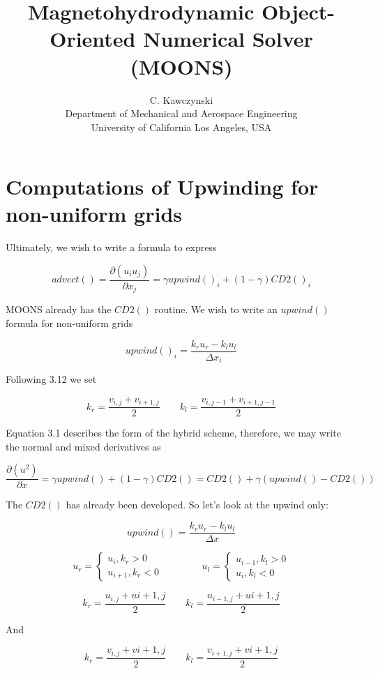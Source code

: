 \documentclass[11pt]{article}
\begin{document}
\doublespacing
\title{Magnetohydrodynamic Object-Oriented Numerical Solver (MOONS)}
\author{C. Kawczynski \\
Department of Mechanical and Aerospace Engineering \\
University of California Los Angeles, USA\\
}
\maketitle

\section{Computations of Upwinding for non-uniform grids}

Ultimately, we wish to write a formula to express

\begin{equation}
	advect() = \frac{\partial(u_i u_j)}{\partial x_j}
	=
	\gamma upwind()_i
	+
	(1-\gamma) CD2()_i
\end{equation}

MOONS already has the $CD2()$ routine. We wish to write an $upwind()$ formula for non-uniform grids

\begin{equation}
	upwind()_i = \frac{k_r u_r - k_l u_l}{\Delta x_i}
\end{equation}

Following 3.12 we set

\begin{equation}
	k_r = \frac{v_{i,j}+v_{i+1,j}}{2} \qquad
	k_l = \frac{v_{i,j-1}+v_{i+1,j-1}}{2}
\end{equation}

Equation 3.1 describes the form of the hybrid scheme, therefore, we may write the normal and mixed derivatives as

\begin{equation}
	\frac{\partial(u^2)}{\partial x} = \gamma upwind() + (1-\gamma) CD2()
	=
	CD2() + \gamma (upwind()-CD2())
\end{equation}

The $CD2()$ has already been developed. So let's look at the upwind only:

\begin{equation}
	upwind() = \frac{k_r u_r - k_l u_l}{\Delta x}
\end{equation}

\begin{equation}
	u_r =
	\begin{cases}
	u_i , k_r>0 \\
	u_{i+1} , k_r <0
	\end{cases}
	\qquad
	\qquad
	u_l =
	\begin{cases}
	u_{i-1} , k_l>0 \\
	u_{i} , k_l <0
	\end{cases}
\end{equation}

\begin{equation}
	k_r = \frac{u_{i,j}+u{i+1,j}}{2}
	\qquad
	k_l = \frac{u_{i-1,j}+u{i+1,j}}{2}
\end{equation}

And

\begin{equation}
	k_r = \frac{v_{i,j}+v{i+1,j}}{2}
	\qquad
	k_l = \frac{v_{i+1,j}+v{i+1,j}}{2}
\end{equation}
\end{document}
